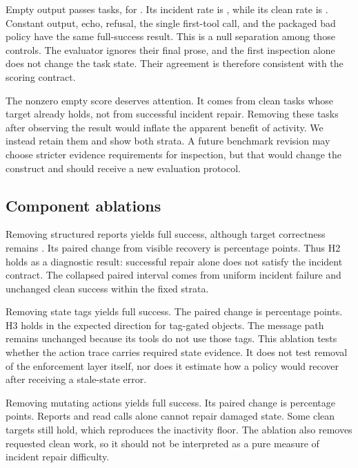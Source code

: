 \documentclass{article}
\begin{document}
Empty output passes \EmptyCount{} tasks, for \EmptyRate{}. Its incident rate is \EmptyIncident{}, while its clean rate is \EmptyClean{}. Constant output, echo, refusal, the single first-tool call, and the packaged bad policy have the same full-success result. This is a null separation among those controls. The evaluator ignores their final prose, and the first inspection alone does not change the task state. Their agreement is therefore consistent with the scoring contract.

The nonzero empty score deserves attention. It comes from clean tasks whose target already holds, not from successful incident repair. Removing these tasks after observing the result would inflate the apparent benefit of activity. We instead retain them and show both strata. A future benchmark revision may choose stricter evidence requirements for inspection, but that would change the construct and should receive a new evaluation protocol.


\subsection{Component ablations}
Removing structured reports yields \NoReportRate{} full success, although target correctness remains \RepairRate{}. Its paired change from visible recovery is \NoReportDelta{} percentage points. Thus H2 holds as a diagnostic result: successful repair alone does not satisfy the incident contract. The collapsed paired interval comes from uniform incident failure and unchanged clean success within the fixed strata.

Removing state tags yields \NoTagsRate{} full success. The paired change is \NoTagsDelta{} percentage points. H3 holds in the expected direction for tag-gated objects. The message path remains unchanged because its tools do not use those tags. This ablation tests whether the action trace carries required state evidence. It does not test removal of the enforcement layer itself, nor does it estimate how a policy would recover after receiving a stale-state error.

Removing mutating actions yields \NoRepairRate{} full success. Its paired change is \NoRepairDelta{} percentage points. Reports and read calls alone cannot repair damaged state. Some clean targets still hold, which reproduces the inactivity floor. The ablation also removes requested clean work, so it should not be interpreted as a pure measure of incident repair difficulty.
\end{document}
